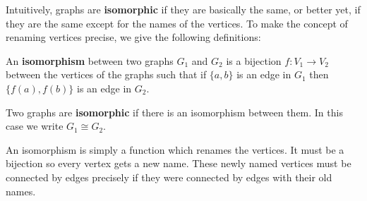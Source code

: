 \documentclass[10pt,]{book}
\newcommand{\terminology}[1]{\textbf{#1}}
\theoremstyle{plain}
\theoremstyle{definition}
\theoremstyle{definition}
\theoremstyle{definition}
\theoremstyle{definition}
\numberwithin{equation}{chapter}
\def\isom{\cong}
\begin{document}
\hypertarget{p-41}{}%
Intuitively, graphs are \terminology{isomorphic}  if they are basically the same, or better yet, if they are the same except for the names of the vertices. To make the concept of renaming vertices precise, we give the following definitions:%
\begin{assemblage}\label{assemblage-2}
\hypertarget{p-42}{}%
 An \terminology{isomorphism} between two graphs \(G_1\) and \(G_2\) is a bijection \(f:V_1 \to V_2\) between the vertices of the graphs such that if \(\{a,b\}\) is an edge in \(G_1\) then \(\{f(a), f(b)\}\) is an edge in \(G_2\).%
\par
\hypertarget{p-43}{}%
Two graphs are \terminology{isomorphic} if there is an isomorphism between them. In this case we write \(G_1 \isom G_2\).%
\end{assemblage}
\hypertarget{p-44}{}%
An isomorphism is simply a function which renames the vertices. It must be a bijection so every vertex gets a new name. These newly named vertices must be connected by edges precisely if they were connected by edges with their old names.%
\end{document}
